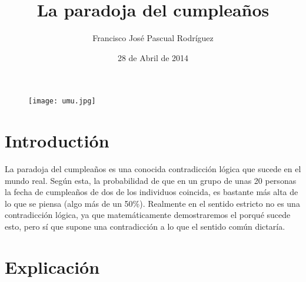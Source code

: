 \documentclass[a4paper]{article}
\title{La paradoja del cumpleaños}
\author{Francisco José Pascual Rodríguez}
\date{28 de Abril de 2014}
\begin{document}
\maketitle
\begin{figure}[h]
\begin{center}
\texttt{[image: umu.jpg]}
\end{center}
\end{figure}






\section{Introductión}

La paradoja del cumpleaños es una conocida contradicción lógica que sucede en el mundo real. Según esta, la probabilidad de que en un grupo de unas 20 personas la fecha de cumpleaños de dos de los individuos coincida, es bastante más alta de lo que se piensa (algo más de un 50\%). Realmente en el sentido estricto no es una contradicción lógica, ya que matemáticamente demostraremos el porqué sucede esto, pero sí que supone una contradicción a lo que el sentido común dictaría.


\section{Explicación}
\end{document}
